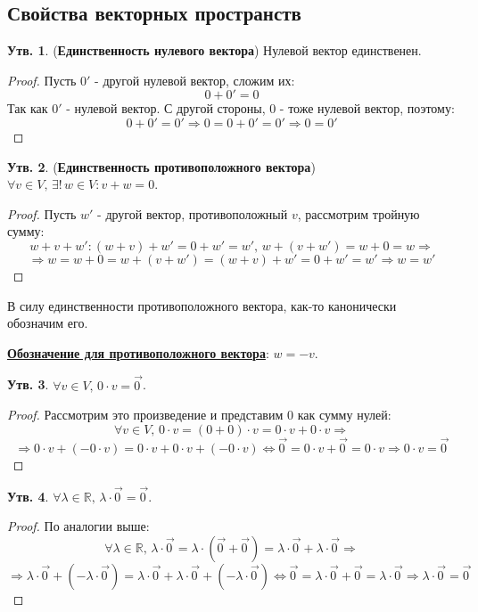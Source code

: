 \documentclass[12pt]{article}
\newcommand{\MR}{\mathbb{R}}
\theoremstyle{definition}
\newtheorem{prop}{Утв.}
\newcommand{\vecm}[1]{\overrightarrow{#1\,}}
\begin{document}
\subsection*{Свойства векторных пространств}
\begin{prop}(\textbf{Единственность нулевого вектора})
	Нулевой вектор единственен.
\end{prop}
\begin{proof}
	Пусть $0'$ - другой нулевой вектор, сложим их:
	$$
		0 + 0' = 0		
	$$
	Так как $0'$ - нулевой вектор. С другой стороны, $0$ - тоже нулевой вектор, поэтому:
	$$
		0 + 0' = 0' \Rightarrow  0 = 0 + 0' = 0' \Rightarrow 0 = 0'
	$$
\end{proof}

\begin{prop}(\textbf{Единственность противоположного вектора})
	$\forall v \in V, \, \exists! \, w \in V \colon v + w = 0$.
\end{prop}
\begin{proof}
	Пусть $w'$ - другой вектор, противоположный $v$, рассмотрим тройную сумму:
	$$
		w+ v + w' \colon (w + v) + w' = 0 + w' = w', \, w + (v + w') = w + 0 = w \Rightarrow
	$$
	$$
		\Rightarrow  w = w + 0 = w + (v + w') = (w + v) + w' = 0 + w' = w' \Rightarrow w = w'
	$$
\end{proof}

В силу единственности противоположного вектора, как-то канонически обозначим его.

\uline{\textbf{Обозначение для противоположного вектора}}: $w = -v$.

\begin{prop}
	$\forall  v \in V,\,  0 {\cdot} v = \vecm{0}$.
\end{prop}
\begin{proof}
	Рассмотрим это произведение и представим $0$ как сумму нулей:
	$$
		\forall v \in V, \, 0{\cdot}v = (0 + 0){\cdot}v = 0{\cdot}v + 0{\cdot}v \Rightarrow 
	$$
	$$
		\Rightarrow 0{\cdot}v + (-0{\cdot}v) = 0{\cdot}v + 0{\cdot}v + (-0{\cdot}v) \Leftrightarrow \vecm{0} = 0{\cdot}v + \vecm{0} = 0{\cdot}v \Rightarrow 0 {\cdot} v = \vecm{0}
	$$
\end{proof}

\begin{prop}
	$\forall \lambda \in \MR, \, \lambda{\cdot}\vecm{0} = \vecm{0}$.
\end{prop}
\begin{proof}
	По аналогии выше:
	$$
		\forall \lambda \in \MR, \, \lambda{\cdot}\vecm{0} = \lambda{\cdot}(\vecm{0} + \vecm{0}) = \lambda{\cdot}\vecm{0} + \lambda{\cdot}\vecm{0} \Rightarrow
	$$
	$$
		\Rightarrow  \lambda{\cdot}\vecm{0} + (-\lambda{\cdot}\vecm{0}) = \lambda{\cdot}\vecm{0} + \lambda{\cdot}\vecm{0}+ (-\lambda{\cdot}\vecm{0}) \Leftrightarrow \vecm{0} = \lambda{\cdot}\vecm{0} + \vecm{0} = \lambda{\cdot}\vecm{0} \Rightarrow \lambda{\cdot}\vecm{0} = \vecm{0}
	$$
\end{proof}
\end{document}
